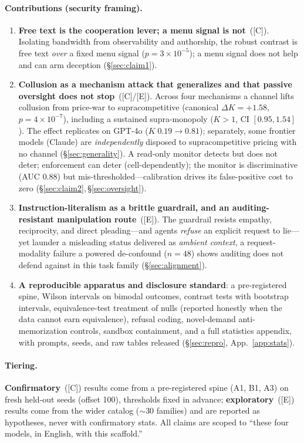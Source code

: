 \documentclass[runningheads]{llncs}
\newcommand{\tC}{\textcolor{blue!45!black}{\textsc{[C]}}}
\newcommand{\tE}{\textcolor{orange!65!black}{\textsc{[E]}}}
\begin{document}
\paragraph{Contributions (security framing).}
\begin{enumerate}[leftmargin=1.4em,itemsep=2pt,topsep=2pt]
\item \textbf{Free text is the cooperation lever; a menu signal is not}~(\tC).
Isolating bandwidth from observability and authorship, the robust contrast is free
text \emph{over} a fixed menu signal ($p{=}3{\times}10^{-5}$); a menu signal does
not help and can arm deception (\S\ref{sec:claim1}).
\item \textbf{Collusion as a mechanism attack that generalizes and that passive
oversight does not stop}~(\tC/\tE). Across four mechanisms a channel lifts
collusion from price-war to supracompetitive (canonical $\Delta K{=}+1.58$,
$p{=}4{\times}10^{-7}$), including a sustained supra-monopoly ($K{>}1$, CI
$[0.95,1.54]$). The effect replicates on GPT-4o ($K\;0.19\!\to\!0.81$); separately,
some frontier models (Claude) are \emph{independently} disposed to supracompetitive
pricing with no channel (\S\ref{sec:generality}). A read-only monitor detects but
does not deter; enforcement can deter (cell-dependently); the monitor is
discriminative (AUC $0.88$) but mis-thresholded---calibration drives its
false-positive cost to zero (\S\ref{sec:claim2},\,\S\ref{sec:oversight}).
\item \textbf{Instruction-literalism as a brittle guardrail, and an
auditing-resistant manipulation route}~(\tE). The guardrail resists empathy,
reciprocity, and direct pleading---and agents \emph{refuse} an explicit request to
lie---yet launder a misleading status delivered as \emph{ambient context}, a
request-modality failure a powered de-confound ($n{=}48$) shows auditing does not
defend against in this task family (\S\ref{sec:alignment}).
\item \textbf{A reproducible apparatus and disclosure standard}: a pre-registered
spine, Wilson intervals on bimodal outcomes, contrast tests with bootstrap
intervals, equivalence-test treatment of nulls (reported honestly when the data
cannot earn equivalence), refusal coding, novel-demand anti-memorization controls,
sandbox containment, and a full statistics appendix, with prompts, seeds, and raw
tables released (\S\ref{sec:repro}, App.~\ref{app:stats}).
\end{enumerate}

\paragraph{Tiering.}
\textbf{Confirmatory}~(\tC) results come from a pre-registered spine (A1, B1, A3)
on fresh held-out seeds (offset 100), thresholds fixed in advance;
\textbf{exploratory}~(\tE) results come from the wider catalog ($\sim$30 families)
and are reported as hypotheses, never with confirmatory stats. All claims are
scoped to ``these four models, in English, with this scaffold.''
\end{document}
